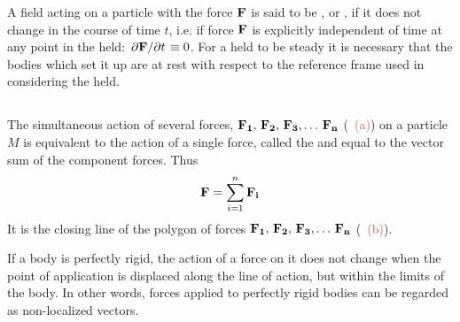 A field acting on a particle with the force $\vb{F}$ is said to be , or , if it does not change in the course of time $t$, i.e. if force $\vb{F}$ is explicitly independent of time at any point in the held: $\pdv*{\vb{F}}{t} \equiv 0$. For a held to be steady it is necessary that the bodies which set it up are at rest with respect to the ref­erence frame used in considering the held.

\subsection{}\label{2.2.2} The simultaneous action of several forces, $\vb{F_{1}}, \,\vb{F_{2}},\,\vb{F_{3}},\ldots{} \,\vb{F_{n}}$ (~\textcolor{IndianRed}{(a)}) on a particle $M$ is equivalent to the action of a single force, called the  and equal to the vector sum of the component forces. Thus
\begin{equation*}%
\vb{F}= \sum_{i=1}^{n} \vb{F_{i}}
\end{equation*}
It is the closing line of the polygon of forces $\vb{F_{1}}, \,\vb{F_{2}},\,\vb{F_{3}},\ldots{} \,\vb{F_{n}}$ (~\textcolor{IndianRed}{(b)}).

\begin{figure}[!ht]
\centering

\end{figure}


If a body is perfectly rigid, the action of a force on it does not
change when the point of application is displaced along the line of action, but within the limits of the body. In other words, forces applied to perfectly rigid bodies can be regarded as non-localized vectors.

